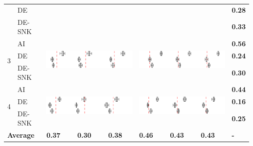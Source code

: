 \begin{table}[ht]
\begin{tabularx}{\textwidth}{llXXXXXXl}
& DE & \multicolumn{3}{c}{} & \multicolumn{3}{c}{} & \textbf{0.28}\\
& DE-SNK & \multicolumn{3}{c}{} & \multicolumn{3}{c}{} & \textbf{0.33}\\
\cmidrule(lr){1-2} \cmidrule(lr){3-5} \cmidrule(lr){6-8} \cmidrule(lr){9-9}
\multirow{3}{*}{3} & AI & \multicolumn{3}{c}{\multirow{3}{*}{\includegraphics[width=6cm]{Figures/boxplots_model3_priorbroad.png}}} & \multicolumn{3}{c}{\multirow{3}{*}{\includegraphics[width=6cm]{Figures/boxplots_model3_priornarrow.png}}} & \textbf{0.56}\\
& DE & \multicolumn{3}{c}{} & \multicolumn{3}{c}{} & \textbf{0.24}\\
& DE-SNK & \multicolumn{3}{c}{} & \multicolumn{3}{c}{} & \textbf{0.30}\\
\cmidrule(lr){1-2} \cmidrule(lr){3-5} \cmidrule(lr){6-8} \cmidrule(lr){9-9}
\multirow{3}{*}{4} & AI & \multicolumn{3}{c}{\multirow{3}{*}{\includegraphics[width=6cm]{Figures/boxplots_model4_priorbroad.png}}} & \multicolumn{3}{c}{\multirow{3}{*}{\includegraphics[width=6cm]{Figures/boxplots_model4_priornarrow.png}}} & \textbf{0.44}\\
& DE & \multicolumn{3}{c}{} & \multicolumn{3}{c}{} & \textbf{0.16}\\
& DE-SNK & \multicolumn{3}{c}{} & \multicolumn{3}{c}{} & \textbf{0.25}\\
\midrule
\multicolumn{2}{l}{\textbf{Average}} & \hspace{13pt}\textbf{0.37} & \hspace{13pt}\textbf{0.30} & \hspace{13pt}\textbf{0.38} & \hspace{13pt}\textbf{0.46} & \hspace{13pt}\textbf{0.43} & \hspace{13pt}\textbf{0.43} & \textbf{-}\\
\bottomrule
\end{tabularx}
\end{table}

